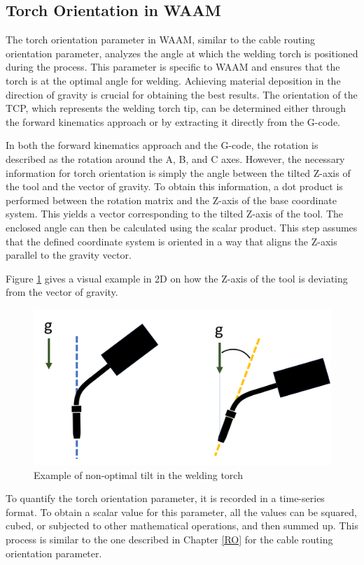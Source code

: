   

\subsection{Torch Orientation in WAAM}
The torch orientation parameter in WAAM, similar to the cable routing orientation parameter, analyzes the angle at which the welding torch is positioned during the process. This parameter is specific to WAAM and ensures that the torch is at the optimal angle for welding. Achieving material deposition in the direction of gravity is crucial for obtaining the best results. The orientation of the TCP, which represents the welding torch tip, can be determined either through the forward kinematics approach or by extracting it directly from the G-code.

In both the forward kinematics approach and the G-code, the rotation is described as the rotation around the A, B, and C axes. However, the necessary information for torch orientation is simply the angle between the tilted Z-axis of the tool and the vector of gravity. To obtain this information, a dot product is performed between the rotation matrix and the Z-axis of the base coordinate system. This yields a vector corresponding to the tilted Z-axis of the tool. The enclosed angle can then be calculated using the scalar product. This step assumes that the defined coordinate system is oriented in a way that aligns the Z-axis parallel to the gravity vector.

Figure \ref{tilt} gives a visual example in 2D on how the Z-axis of the tool is deviating from the vector of gravity.

\begin{figure}[H]
	\centerline{\includegraphics[width=.5\textwidth]{figures/ttilt.png}}
	\caption{Example of non-optimal tilt in the welding torch}
	\label{tilt}
\end{figure}

To quantify the torch orientation parameter, it is recorded in a time-series format. To obtain a scalar value for this parameter, all the values can be squared, cubed, or subjected to other mathematical operations, and then summed up. This process is similar to the one described in Chapter \ref{RO} for the cable routing orientation parameter.



